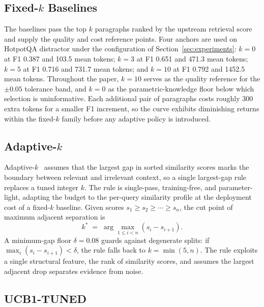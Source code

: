 \documentclass[runningheads]{llncs}
\begin{document}
\subsection{Fixed-$k$ Baselines}
\label{subsec:methods_fixed}

The baselines pass the top $k$ paragraphs ranked by the upstream retrieval score and supply the quality and cost reference points. Four anchors are used on HotpotQA distractor under the configuration of Section~\ref{sec:experiments}: $k{=}0$ at F1 0.387 and 103.5 mean tokens; $k{=}3$ at F1 0.651 and 471.3 mean tokens; $k{=}5$ at F1 0.716 and 731.7 mean tokens; and $k{=}10$ at F1 0.792 and 1452.5 mean tokens. Throughout the paper, $k{=}10$ serves as the quality reference for the $\pm 0.05$ tolerance band, and $k{=}0$ as the parametric-knowledge floor below which selection is uninformative. Each additional pair of paragraphs costs roughly $300$ extra tokens for a smaller F1 increment, so the curve exhibits diminishing returns within the fixed-$k$ family before any adaptive policy is introduced.

\subsection{Adaptive-$k$}
\label{subsec:methods_adaptivek}

Adaptive-$k$~\cite{taguchi2025adaptivek} assumes that the largest gap in sorted similarity scores marks the boundary between relevant and irrelevant context, so a single largest-gap rule replaces a tuned integer $k$. The rule is single-pass, training-free, and parameter-light, adapting the budget to the per-query similarity profile at the deployment cost of a fixed-$k$ baseline. Given scores $s_1 \ge s_2 \ge \cdots \ge s_n$, the cut point of maximum adjacent separation is
\begin{equation}
\label{eq:adaptivek}
k^* \;=\; \arg\max_{1\le i<n}(s_i - s_{i+1}).
\end{equation}
A minimum-gap floor $\delta=0.08$ guards against degenerate splits: if $\max_i (s_i - s_{i+1}) < \delta$, the rule falls back to $k=\min(5,n)$. The rule exploits a single structural feature, the rank of similarity scores, and assumes the largest adjacent drop separates evidence from noise.

\subsection{UCB1-TUNED}
\label{subsec:methods_ucb1}
\end{document}
